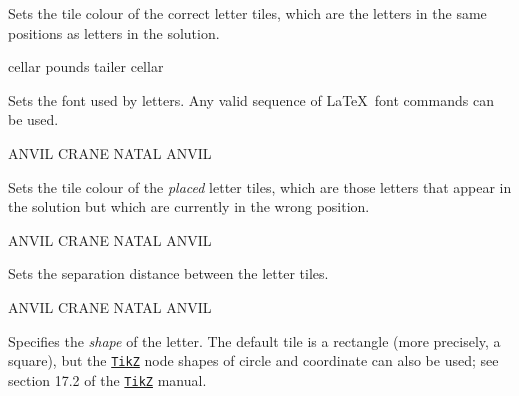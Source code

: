 \documentclass[svgnames]{report}
\newcommand\ctan[1]{\href{https://www.ctan.org/pkg/#1}{\texttt{#1}}}
\begin{document}

  Sets the tile colour of the correct  letter tiles,
  which are the letters in the same positions as letters in the solution.

  \begin{example}
    \begin{wordle}[correct=LightSkyBlue]{cellar}
      pounds
      tailer
      cellar
    \end{wordle}
  \end{example}


  Sets the font used by  letters. Any valid sequence of
  \LaTeX\ font commands can be used.

  \begin{example}
    \begin{wordle}[font=\large\sffamily]{ANVIL}
      CRANE
      NATAL
      ANVIL
    \end{wordle}
  \end{example}


  Sets the tile colour of the \textit{placed}  letter tiles,
  which are those letters that appear in the solution but which are
  currently in the wrong position.

  \begin{example}
    \begin{wordle}[placed=Orange]{ANVIL}
      CRANE
      NATAL
      ANVIL
    \end{wordle}
  \end{example}


  Sets the separation distance between the  letter
  tiles.

  \begin{example}
    \begin{wordle}[separation=2mm]{ANVIL}
      CRANE
      NATAL
      ANVIL
    \end{wordle}
  \end{example}


  Specifies the \textit{shape} of the  letter. The default tile
   is a \textsf{rectangle} (more precisely, a square), but the
  \ctan{TikZ} node shapes of \textsf{circle} and \textsf{coordinate} can
  also be used; see section 17.2 of the \ctan{TikZ} manual.
\end{document}
